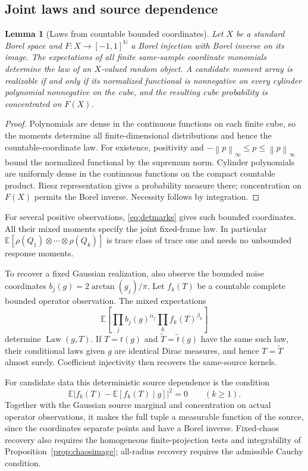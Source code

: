 \documentclass[11pt,a4paper]{amsart}
\numberwithin{equation}{section}
\newtheorem{lemma}[theorem]{Lemma}
\theoremstyle{definition}
\theoremstyle{remark}
\newcommand{\N}{\mathbb N}
\newcommand{\E}{\mathbb E}
\DeclareMathOperator{\Law}{Law}
\newcommand{\norm}[1]{\left\lVert#1\right\rVert}
\begin{document}
\subsection{Joint laws and source dependence}
\begin{lemma}[Laws from countable bounded coordinates]\label{lem:boundedlaw}
Let $X$ be a standard Borel space and $F:X\to[-1,1]^\N$ a Borel injection with Borel inverse on its image. The expectations of all finite same-sample coordinate monomials determine the law of an $X$-valued random object. A candidate moment array is realizable if and only if its normalized functional is nonnegative on every cylinder polynomial nonnegative on the cube, and the resulting cube probability is concentrated on $F(X)$.
\end{lemma}
\begin{proof}
Polynomials are dense in the continuous functions on each finite cube, so the moments determine all finite-dimensional distributions and hence the countable-coordinate law. For existence, positivity and
$-\norm p_\infty\le p\le\norm p_\infty$
bound the normalized functional by the supremum norm. Cylinder polynomials are uniformly dense in the continuous functions on the compact countable product. Riesz representation gives a probability measure there; concentration on $F(X)$ permits the Borel inverse. Necessity follows by integration.
\end{proof}

For several positive observations, \eqref{eq:detmarks} gives such bounded coordinates. All their mixed moments specify the joint fixed-frame law. In particular
$\E[\rho(Q_1)\otimes\cdots\otimes\rho(Q_k)]$
is trace class of trace one and needs no unbounded response moments.

To recover a fixed Gaussian realization, also observe the bounded noise coordinates $b_j(g)=2\arctan(g_j)/\pi$. Let $f_k(T)$ be a countable complete bounded operator observation. The mixed expectations
\begin{equation}\label{eq:boundednoisemarks}
 \E\left[\prod_jb_j(g)^{\alpha_j}\prod_kf_k(T)^{\beta_k}\right]
\end{equation}
determine $\Law(g,T)$. If $T=t(g)$ and $\widetilde T=\widetilde t(g)$ have the same such law, their conditional laws given $g$ are identical Dirac measures, and hence $T=\widetilde T$ almost surely. Coefficient injectivity then recovers the same-source kernels.

For candidate data this deterministic source dependence is the condition
\begin{equation}\label{eq:graphcert}
 \E\left|f_k(T)-\E[f_k(T)\mid g]\right|^2=0\qquad(k\ge1).
\end{equation}
Together with the Gaussian source marginal and concentration on actual operator observations, it makes the full tuple a measurable function of the source, since the coordinates separate points and have a Borel inverse. Fixed-chaos recovery also requires the homogeneous finite-projection tests and integrability of Proposition~\ref{prop:chaosimage}; all-radius recovery requires the admissible Cauchy condition.
\end{document}
